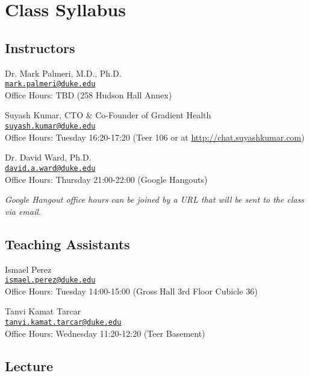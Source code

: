



\section*{Class Syllabus}

\subsection*{Instructors}

Dr. Mark Palmeri, M.D., Ph.D.\\
\href{mailto:mark.palmeri@duke.edu}{\nolinkurl{mark.palmeri@duke.edu}}\\
Office Hours: TBD (258 Hudson Hall Annex)

Suyash Kumar, CTO \& Co-Founder of Gradient Health\\
\href{mailto:suyash.kumar@duke.edu}{\nolinkurl{suyash.kumar@duke.edu}}\\
Office Hours: Tuesday 16:20-17:20 (Teer 106 or at
\href{http://chat.suyashkumar.com}{http://chat.suyashkumar.com})

Dr. David Ward, Ph.D.\\
\href{mailto:david.a.ward@duke.edu}{\nolinkurl{david.a.ward@duke.edu}}\\
Office Hours: Thursday 21:00-22:00 (Google Hangouts)

\emph{Google Hangout office hours can be joined by a URL that will be
sent to the class via email.}

\subsection*{Teaching Assistants}

Ismael Perez\\
\href{mailto:ismael.perez@duke.edu}{\nolinkurl{ismael.perez@duke.edu}}\\
Office Hours: Tuesday 14:00-15:00 (Gross Hall 3rd Floor Cubicle 36)

Tanvi Kamat Tarcar\\
\href{mailto:tanvi.kamat.tarcar@duke.edu}{\nolinkurl{tanvi.kamat.tarcar@duke.edu}}\\
Office Hours: Wednesday 11:20-12:20 (Teer Basement)

\subsection*{Lecture}

